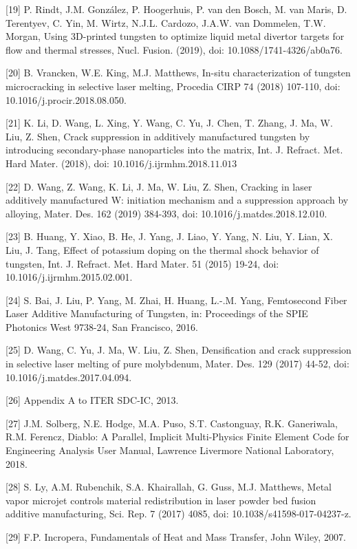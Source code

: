 \documentclass[10pt]{article}
\begin{document}
[19] P. Rindt, J.M. González, P. Hoogerhuis, P. van den Bosch, M. van Maris, D. Terentyev, C. Yin, M. Wirtz, N.J.L. Cardozo, J.A.W. van Dommelen, T.W. Morgan, Using 3D-printed tungsten to optimize liquid metal divertor targets for flow and thermal stresses, Nucl. Fusion. (2019), doi: 10.1088/1741-4326/ab0a76.

[20] B. Vrancken, W.E. King, M.J. Matthews, In-situ characterization of tungsten microcracking in selective laser melting, Procedia CIRP 74 (2018) 107-110, doi: 10.1016/j.procir.2018.08.050.

[21] K. Li, D. Wang, L. Xing, Y. Wang, C. Yu, J. Chen, T. Zhang, J. Ma, W. Liu, Z. Shen, Crack suppression in additively manufactured tungsten by introducing secondary-phase nanoparticles into the matrix, Int. J. Refract. Met. Hard Mater. (2018), doi: $10.1016 / \mathrm{j} . \mathrm{ijrmhm} .2018 .11 .013$

[22] D. Wang, Z. Wang, K. Li, J. Ma, W. Liu, Z. Shen, Cracking in laser additively manufactured W: initiation mechanism and a suppression approach by alloying, Mater. Des. 162 (2019) 384-393, doi: 10.1016/j.matdes.2018.12.010.

[23] B. Huang, Y. Xiao, B. He, J. Yang, J. Liao, Y. Yang, N. Liu, Y. Lian, X. Liu, J. Tang, Effect of potassium doping on the thermal shock behavior of tungsten, Int. J. Refract. Met. Hard Mater. 51 (2015) 19-24, doi: 10.1016/j.ijrmhm.2015.02.001.

[24] S. Bai, J. Liu, P. Yang, M. Zhai, H. Huang, L.-.M. Yang, Femtosecond Fiber Laser Additive Manufacturing of Tungsten, in: Proceedings of the SPIE Photonics West 9738-24, San Francisco, 2016.

[25] D. Wang, C. Yu, J. Ma, W. Liu, Z. Shen, Densification and crack suppression in selective laser melting of pure molybdenum, Mater. Des. 129 (2017) 44-52, doi: 10.1016/j.matdes.2017.04.094.

[26] Appendix A to ITER SDC-IC, 2013.

[27] J.M. Solberg, N.E. Hodge, M.A. Puso, S.T. Castonguay, R.K. Ganeriwala, R.M. Ferencz, Diablo: A Parallel, Implicit Multi-Physics Finite Element Code for Engineering Analysis User Manual, Lawrence Livermore National Laboratory, 2018.

[28] S. Ly, A.M. Rubenchik, S.A. Khairallah, G. Guss, M.J. Matthews, Metal vapor microjet controls material redistribution in laser powder bed fusion additive manufacturing, Sci. Rep. 7 (2017) 4085, doi: 10.1038/s41598-017-04237-z.

[29] F.P. Incropera, Fundamentals of Heat and Mass Transfer, John Wiley, 2007.
\end{document}
